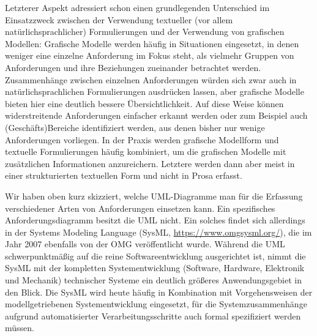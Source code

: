 \vspace{1mm} %

Letzterer Aspekt adressiert schon einen grundlegenden Unterschied im Einsatzzweck zwischen der Verwendung textueller (vor allem natürlichsprachlicher) Formulierungen und der Verwendung von grafischen Modellen: Grafische Modelle werden häufig in Situationen eingesetzt, in denen weniger eine einzelne Anforderung im Fokus steht, als vielmehr Gruppen von Anforderungen und ihre Beziehungen zueinander betrachtet werden. Zusammenhänge zwischen einzelnen Anforderungen würden sich zwar auch in natürlichsprachlichen Formulierungen ausdrücken lassen, aber grafische Modelle bieten hier eine deutlich bessere Übersichtlichkeit. Auf diese Weise können widerstreitende Anforderungen einfacher erkannt werden oder zum Beispiel auch (Geschäfts)Bereiche identifiziert werden, aus denen bisher nur wenige Anforderungen vorliegen. In der Praxis werden grafische Modellform und textuelle Formulierungen häufig kombiniert, um die grafischen Modelle mit zusätzlichen Informationen anzureichern. Letztere werden dann aber meist in einer strukturierten textuellen Form und nicht in Prosa erfasst.

\vspace{2mm} %


\vspace{1mm} %

Wir haben oben kurz skizziert, welche UML-Diagramme man für die Erfassung verschiedener Arten von Anforderungen einsetzen kann. Ein spezifisches Anforderungsdiagramm besitzt die UML nicht. Ein solches findet sich allerdings in der Systems Modeling Language (SysML, \url{https://www.omgsysml.org/}), die im Jahr 2007 ebenfalls von der OMG veröffentlicht wurde. Während die UML schwerpunktmäßig auf die reine Softwareentwicklung ausgerichtet ist, nimmt die SysML mit der kompletten Systementwicklung (Software, Hardware, Elektronik und Mechanik) technischer Systeme ein deutlich größeres Anwendungsgebiet in den Blick. Die SysML wird heute häufig in Kombination mit Vorgehensweisen der modellgetriebenen System\-entwicklung eingesetzt, für die Systemzusammenhänge aufgrund automatisierter Verarbeitungsschritte auch formal spezifiziert werden müssen. 

\vspace{1mm} %

